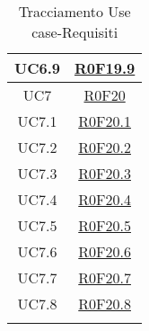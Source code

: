 \documentclass[../AnalisiDeiRequisiti.tex]{subfiles}
\begin{document}
\begin{longtable}{|c|c|}
	UC6.9 & \hyperlink{R0F19.9}{R0F19.9}\\\hline
	UC7 & \hyperlink{R0F20}{R0F20}\\\hline
	UC7.1 & \hyperlink{R0F20.1}{R0F20.1}\\\hline
	UC7.2 & \hyperlink{R0F20.2}{R0F20.2}\\\hline
	UC7.3 & \hyperlink{R0F20.3}{R0F20.3}\\\hline
	UC7.4 & \hyperlink{R0F20.4}{R0F20.4}\\\hline
	UC7.5 & \hyperlink{R0F20.5}{R0F20.5}\\\hline
	UC7.6 & \hyperlink{R0F20.6}{R0F20.6}\\\hline
	UC7.7 & \hyperlink{R0F20.7}{R0F20.7}\\\hline
	UC7.8 & \hyperlink{R0F20.8}{R0F20.8}\\\hline
	\caption[Tracciamento Use case-Requisiti]{Tracciamento Use case-Requisiti}
	\label{tabella:fonti-requi}
\end{longtable}
\clearpage
\end{document}

